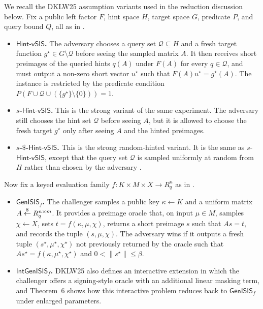 \begin{definition}\label{def:dklw-assumptions}
We recall the DKLW25 assumption variants used in the reduction discussion below.
Fix a public left factor \(F\), hint space \(H\), target space \(G\), predicate \(P\), and query bound \(Q\), all as in
\cite[Definition~5]{EPRINT:DKLW25}.
\begin{itemize}[leftmargin=1.25em]
  \item \textbf{\(\mathsf{Hint\mbox{-}vSIS}\).} The adversary chooses a query set \(\mathcal{Q}\subseteq H\) and a fresh
  target function \(g^\star\in G\setminus \mathcal{Q}\) before seeing the sampled matrix \(A\). It then receives short
  preimages of the queried hints \(q(A)\) under \(F(A)\) for every \(q\in\mathcal{Q}\), and must output a non-zero short
  vector \(u^\star\) such that \(F(A)u^\star=g^\star(A)\). The instance is restricted by the predicate condition
  \(P(F\cup \mathcal{Q}\cup(\{g^\star\}\setminus\{0\}))=1\).
  \item \textbf{\(s\)-\(\mathsf{Hint\mbox{-}vSIS}\).} This is the strong variant of the same experiment. The adversary still
  chooses the hint set \(\mathcal{Q}\) before seeing \(A\), but it is allowed to choose the fresh target \(g^\star\) only
  after seeing \(A\) and the hinted preimages.
  \item \textbf{\(s\)-\(\$\)-\(\mathsf{Hint\mbox{-}vSIS}\).} This is the strong random-hinted variant. It is the same as
  \(s\)-\(\mathsf{Hint\mbox{-}vSIS}\), except that the query set \(\mathcal{Q}\) is sampled uniformly at random from \(H\)
  rather than chosen by the adversary \cite[Definition~5]{EPRINT:DKLW25}.
\end{itemize}

Now fix a keyed evaluation family \(f:K\times M\times X\to R_q^n\) as in \cite[Definition~8]{EPRINT:DKLW25}.
\begin{itemize}[leftmargin=1.25em]
  \item \textbf{\(\mathsf{GenISIS}_f\).} The challenger samples a public key \(\kappa\gets K\) and a uniform matrix
  \(A\overset{\$}{\leftarrow} R_q^{n\times m}\). It provides a preimage oracle that, on input \(\mu\in M\), samples \(\chi\gets X\),
  sets \(t=f(\kappa,\mu,\chi)\), returns a short preimage \(s\) such that \(As=t\), and records the tuple
  \((s,\mu,\chi)\). The adversary wins if it outputs a fresh tuple \((s^\star,\mu^\star,\chi^\star)\) not previously
  returned by the oracle such that \(As^\star=f(\kappa,\mu^\star,\chi^\star)\) and \(0<\|s^\star\|\le \beta\).
  \item \textbf{\(\mathsf{IntGenISIS}_f\).} DKLW25 also defines an interactive extension in which the challenger offers a
  signing-style oracle with an additional linear masking term, and Theorem~6 shows how this interactive problem reduces
  back to \(\mathsf{GenISIS}_f\) under enlarged parameters.
\end{itemize}
\end{definition}

